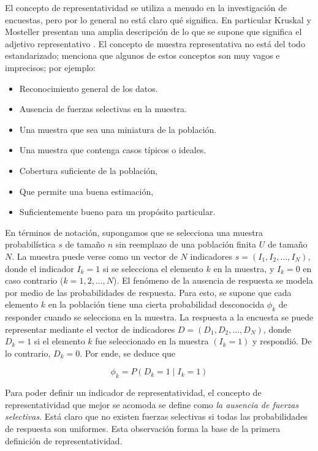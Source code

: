 \documentclass[
  12pt,
]{book}
\providecommand{\tightlist}{%
  \setlength{\itemsep}{0pt}\setlength{\parskip}{0pt}}
\begin{document}
El concepto de representatividad se utiliza a menudo en la investigación
de encuestas, pero por lo general no está claro qué significa. En particular Kruskal y Mosteller presentan una amplia descripción
de lo que se supone que significa el adjetivo representativo \citep[\citet{KruskalMosteller2}, \citet{KruskalMosteller3}, \citet{KruskalMosteller4}]{KruskalMosteller1}. El concepto de muestra representativa no está del todo estandarizado; \citet{Bethlehem_Cobben_Schouten_2009} menciona que algunos de estos conceptos son muy vagos e imprecisos; por ejemplo:

\begin{itemize}
\tightlist
\item
  Reconocimiento general de los datos.
\item
  Ausencia de fuerzas selectivas en la muestra.
\item
  Una muestra que sea una miniatura de la población.
\item
  Una muestra que contenga casos típicos o ideales.
\item
  Cobertura suficiente de la población,
\item
  Que permite una buena estimación,
\item
  Suficientemente bueno para un propósito particular.
\end{itemize}

En términos de notación, supongamos que se selecciona una muestra probabilística \(s\) de tamaño \(n\) sin reemplazo de una población finita \(U\) de tamaño \(N\). La muestra puede verse como un vector de \(N\) indicadores \(s=(I_{1},I_{2},\ldots,I_{N})\), donde el indicador \(I_{k}=1\) si se selecciona el elemento \(k\) en la muestra, y \(I_{k}=0\) en caso contrario (\(k=1,2,\ldots,N\)). El fenómeno de la ausencia de respuesta se modela por medio de las probabilidades de respuesta. Para esto, se supone que cada elemento \(k\) en la población tiene una cierta probabilidad desconocida \(\phi_{k}\) de responder cuando se selecciona en la muestra. La respuesta a la encuesta se puede representar mediante el vector de indicadores \(D=(D_{1},D_{2},\ldots,D_{N})\), donde \(D_{k}=1\) si el elemento \(k\) fue seleccionado en la muestra \((I_{k}=1)\) y respondió. De lo contrario, \(D_{k}=0\). Por ende, se deduce que

\[
\phi_{k}=P\left(D_{k}=1\mid I_{k}=1\right)
\]

Para poder definir un indicador de representatividad, el concepto
de representatividad que mejor se acomoda se define como \emph{la ausencia de fuerzas selectivas}. Está claro que no existen fuerzas selectivas si todas las probabilidades de respuesta son uniformes. Esta observación forma la base de la primera definición de representatividad.
\end{document}
